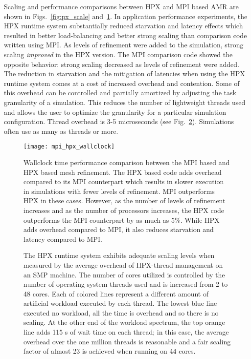\documentclass{revtex4}
\begin{document}
Scaling and performance comparisons between HPX and MPI based AMR are shown in
Figs.~\ref{fig:px_scale} and~\ref{fig:mpi_hpx_wallclock}. 
In application performance experiments, the HPX runtime system substantially
reduced starvation and latency effects which resulted in better load-balancing and better strong scaling
than comparison code written using MPI.
As levels of refinement were added to the simulation, strong
scaling {\it improved} in the HPX version.  The MPI comparison code showed the opposite behavior:
strong scaling decreased as levels of refinement were added.
The reduction in starvation and the mitigation of latencies when using the HPX runtime 
system comes at a cost of increased overhead and contention.  
Some of this overhead can be controlled and partially amortized by adjusting the
task granularity of a simulation.  This reduces the number of lightweight threads used and allows the user
to optimize the granularity for a particular simulation configuration.   Thread
overhead is 3-5 microseconds (see Fig.~\ref{fig:thread_execution_time}).  
Simulations often use as many as  threads or more.

\begin{figure} \centering
\texttt{[image: mpi\_hpx\_wallclock]}
  \caption{\small{Wallclock time performance comparison between the MPI based and HPX
based mesh refinement.  The HPX based code adds overhead
compared to its MPI counterpart which results in slower execution in simulations with fewer
levels of refinement.  MPI outperforms HPX in these cases.  However, as the number of levels
of refinement increases and as the number of processors increases, the HPX code
outperforms the MPI counterpart by as much as 5\%.  While HPX adds overhead
compared to MPI, it also reduces starvation and latency compared to MPI.}
  }
\label{fig:mpi_hpx_wallclock}
\end{figure}


\begin{figure} \centering
{} \caption{\small{
The HPX runtime system
exhibits adequate scaling levels when measured by the average overhead
of HPX-thread management on an SMP machine.  The number of cores utilized is controlled
by the number of operating system threads used and is increased from 2 to 48 cores.
Each of colored lines represent a different amount of artificial workload executed by each
thread.  The lowest blue line executed no workload, all the time is overhead and so there
is no scaling.  At the other end of the workload spectrum, the top orange line adds
115 s of wait time on each thread; in this case, the average overhead over
the one million threads is reasonable and a fair scaling factor of almost 23 is achieved when
running on 44 cores.}
}
\label{fig:thread_execution_time}
\end{figure}
\end{document}
